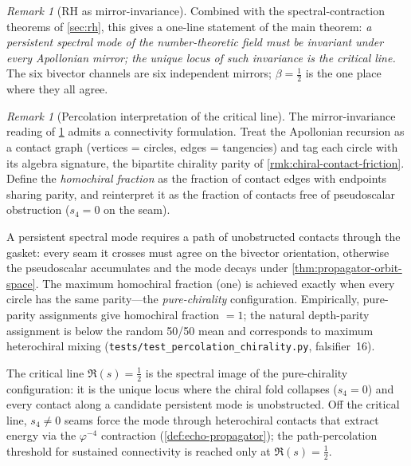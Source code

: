 \documentclass[11pt,a4paper]{article}
\theoremstyle{plain}
\theoremstyle{definition}
\theoremstyle{remark}
\newtheorem{remark}[theorem]{Remark}
\numberwithin{equation}{section}
\newcommand{\vp}{\varphi}
\begin{document}
\begin{remark}[RH as mirror-invariance]
\label{rmk:rh-as-mirror-invariance}
Combined with the spectral-contraction theorems of \cref{sec:rh}, this
gives a one-line statement of the main theorem: \emph{a persistent
spectral mode of the number-theoretic field must be invariant under
every Apollonian mirror; the unique locus of such invariance is the
critical line.}  The six bivector channels are six independent
mirrors; \(\beta=\tfrac12\) is the one place where they all agree.
\end{remark}

\begin{remark}[Percolation interpretation of the critical line]
\label{rmk:percolation-critical-line}
The mirror-invariance reading of \cref{rmk:rh-as-mirror-invariance}
admits a connectivity formulation.  Treat the Apollonian recursion
as a contact graph (vertices = circles, edges = tangencies) and tag
each circle with its algebra signature, the bipartite chirality
parity of \cref{rmk:chiral-contact-friction}.  Define the
\emph{homochiral fraction} as the fraction of contact edges with
endpoints sharing parity, and reinterpret it as the fraction of
contacts free of pseudoscalar obstruction (\(s_4=0\) on the seam).

A persistent spectral mode requires a path of unobstructed contacts
through the gasket: every seam it crosses must agree on the
bivector orientation, otherwise the pseudoscalar accumulates and
the mode decays under \cref{thm:propagator-orbit-space}.  The
maximum homochiral fraction (one) is achieved exactly when every
circle has the same parity---the \emph{pure-chirality} configuration.
Empirically, pure-parity assignments give homochiral fraction
\(=1\); the natural depth-parity assignment is below the random
50/50 mean and corresponds to maximum heterochiral mixing
(\texttt{tests/test\_percolation\_chirality.py}, falsifier~16).

The critical line \(\Re(s)=\tfrac12\) is the spectral image of the
pure-chirality configuration: it is the unique locus where the
chiral fold collapses (\(s_4=0\)) and every contact along a
candidate persistent mode is unobstructed.  Off the critical line,
\(s_4\ne0\) seams force the mode through heterochiral contacts that
extract energy via the \(\vp^{-4}\) contraction
(\cref{def:echo-propagator}); the path-percolation threshold for
sustained connectivity is reached only at \(\Re(s)=\tfrac12\).
\end{remark}
\end{document}
